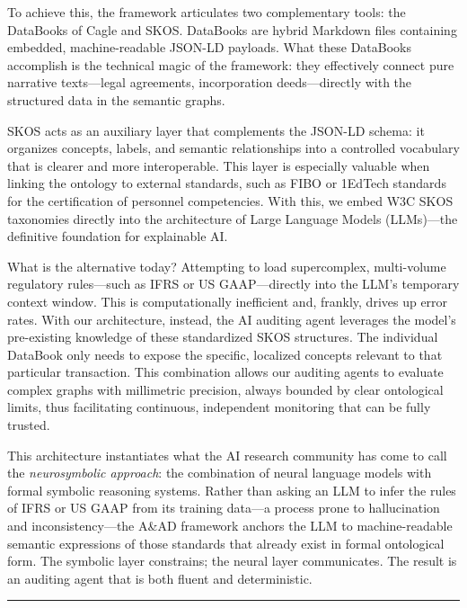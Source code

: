 \documentclass[12pt, a4paper]{article}
\begin{document}
To achieve this, the framework articulates two complementary tools: the DataBooks of Cagle \cite{cagle2026} and SKOS. DataBooks are hybrid Markdown files containing embedded, machine-readable JSON-LD payloads. What these DataBooks accomplish is the technical magic of the framework: they effectively connect pure narrative texts---legal agreements, incorporation deeds---directly with the structured data in the semantic graphs.

SKOS acts as an auxiliary layer that complements the JSON-LD schema: it organizes concepts, labels, and semantic relationships into a controlled vocabulary that is clearer and more interoperable. This layer is especially valuable when linking the ontology to external standards, such as FIBO or 1EdTech standards for the certification of personnel competencies. With this, we embed W3C SKOS \cite{w3cskos} taxonomies directly into the architecture of Large Language Models (LLMs)---the definitive foundation for explainable AI.

What is the alternative today? Attempting to load supercomplex, multi-volume regulatory rules---such as IFRS or US GAAP---directly into the LLM's temporary context window. This is computationally inefficient and, frankly, drives up error rates. With our architecture, instead, the AI auditing agent leverages the model's pre-existing knowledge of these standardized SKOS structures. The individual DataBook only needs to expose the specific, localized concepts relevant to that particular transaction. This combination allows our auditing agents to evaluate complex graphs with millimetric precision, always bounded by clear ontological limits, thus facilitating continuous, independent monitoring that can be fully trusted.

This architecture instantiates what the AI research community has come to call the \textit{neurosymbolic approach}: the combination of neural language models with formal symbolic reasoning systems. Rather than asking an LLM to infer the rules of IFRS or US GAAP from its training data---a process prone to hallucination and inconsistency---the A\&AD framework anchors the LLM to machine-readable semantic expressions of those standards that already exist in formal ontological form. The symbolic layer constrains; the neural layer communicates. The result is an auditing agent that is both fluent and deterministic.

\hrule
\vspace{1em}

\end{document}

